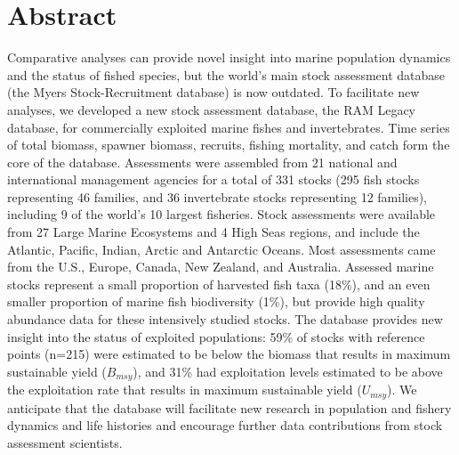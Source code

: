 \section*{Abstract}

Comparative analyses can provide novel insight into marine population dynamics and the status of fished species, but the world's main stock assessment database (the Myers Stock-Recruitment database) is now outdated.  
To facilitate new analyses, we developed a new stock assessment database, the RAM Legacy database, for commercially exploited marine fishes and invertebrates. 
Time series of total biomass, spawner biomass, recruits, fishing mortality, and catch form the core of the database. 
Assessments were assembled from 21 national and international management agencies for a total of 331 stocks (295 fish stocks representing 46 families, and 36 invertebrate stocks representing 12 families), including 9 of the world's 10 largest fisheries. Stock assessments were available from 27 Large Marine Ecosystems and 4 High Seas regions, and include the Atlantic, Pacific, Indian, Arctic and Antarctic Oceans. 
Most assessments came from the U.S., Europe, Canada, New Zealand, and Australia. Assessed marine stocks represent a small proportion of harvested fish taxa (18\%), and an even smaller proportion of marine fish biodiversity (1\%), but provide high quality abundance data for these intensively studied stocks. 
The database provides new insight into the status of exploited populations: 59\% of stocks with reference points (n=215) were estimated to be below the biomass that results in maximum sustainable yield ($B_{msy}$), and 31\% had exploitation levels estimated to be above the exploitation rate that results in maximum sustainable yield ($U_{msy}$).
We anticipate that the database will facilitate new research in population and fishery dynamics and life histories and encourage further data contributions from stock assessment scientists.

